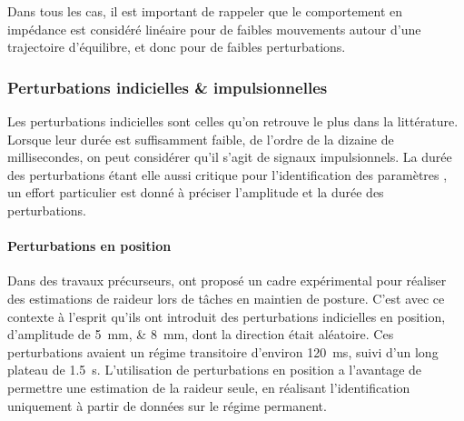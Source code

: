 Dans tous les cas, il est important de rappeler que le comportement en impédance est considéré linéaire pour de faibles mouvements autour d'une trajectoire d'équilibre, et donc pour de faibles perturbations. 

\subsubsection{Perturbations indicielles \& impulsionnelles} \label{chap3_sec_st_art_sub_pert_1}

Les perturbations indicielles sont celles qu'on retrouve le plus dans la littérature. Lorsque leur durée est suffisamment faible, de l'ordre de la dizaine de millisecondes, on peut considérer qu'il s'agit de signaux impulsionnels. La durée des perturbations étant elle aussi critique pour l'identification des paramètres \parencite{kistemaker_vivo_2011}, un effort particulier est donné à préciser l'amplitude et la durée des perturbations.

\paragraph{Perturbations en position}

Dans des travaux précurseurs, \textcite{mussa-ivaldi_neural_1985} ont proposé un cadre expérimental pour réaliser des estimations de raideur lors de tâches en maintien de posture. C'est avec ce contexte à l'esprit qu'ils ont introduit des perturbations indicielles en position, d'amplitude de \SIlist{5;8}{\milli\meter}, dont la direction était aléatoire. Ces perturbations avaient un régime transitoire d'environ \SI{120}{\milli\second}, suivi d'un long plateau de \SI{1.5}{\second}. L'utilisation de perturbations en position a l'avantage de permettre une estimation de la raideur seule, en réalisant l'identification uniquement à partir de données sur le régime permanent. 


